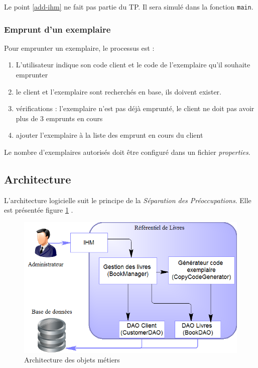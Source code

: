 \documentclass[small,algo]{dushClass}
\begin{document}
Le point \ref{add-ihm} ne fait pas partie du TP. Il sera simulé dans la fonction \texttt{main}.

\subsubsection{Emprunt d'un exemplaire}

Pour emprunter un exemplaire, le processus est :
\begin{enumerate}
\item L'utilisateur indique son code client et le code de l'exemplaire qu'il souhaite emprunter
\item le client et l'exemplaire sont recherchés en base, ils doivent exister.
\item vérifications : l'exemplaire n'est pas déjà emprunté, le client ne doit pas avoir plus de 3 emprunts en cours
\item ajouter l'exemplaire à la liste des emprunt en cours du client\\
\end{enumerate}

Le nombre d'exemplaires autorisés doit être configuré dans un fichier \emph{properties}.

\subsection{Architecture}
L'architecture logicielle suit le principe de la \emph{Séparation des Préoccupations}. Elle est présentée figure \ref{tp-spring-soc} .\\

\begin{figure}[ht]\label{tp-spring-soc}
	\center
	\includegraphics{images/tp-spring-soc.png}
	\caption{Architecture des objets métiers}
\end{figure}
\end{document}
